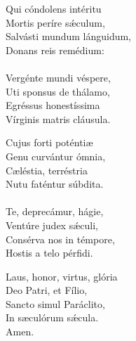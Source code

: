 \begin{multicols}{3}{
\setlength{\parindent}{0pt}
\setlength{\columnseprule}{0pt}
Qui cóndolens intéritu\\
Mortis períre sǽculum,\\
Salvásti mundum lánguidum,\\
Donans reis remédium:\\
\\
Vergénte mundi véspere,\\
Uti sponsus de thálamo,\\
Egréssus honestíssima\\
Vírginis matris cláusula.\columnbreak

Cujus forti poténtiæ\\
Genu curvántur ómnia,\\
Cæléstia, terréstria\\
Nutu faténtur súbdita.\\
\\
Te, deprecámur, hágie,\\
Ventúre judex sǽculi,\\
Consérva nos in témpore,\\
Hostis a telo pérfidi.\columnbreak

Laus, honor, virtus, glória\\
Deo Patri, et Fílio,\\
Sancto simul Paráclito,\\
In sæculórum sǽcula.\\
Amen.
}\end{multicols}
